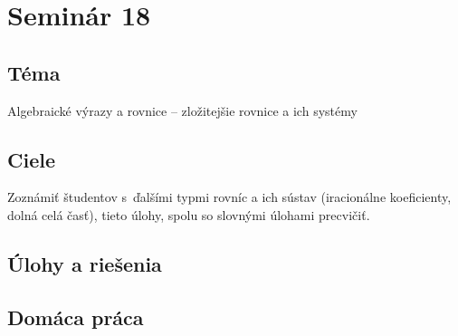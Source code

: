 \section*{Seminár 18}


\subsection*{Téma}
Algebraické výrazy a rovnice -- zložitejšie rovnice a ich systémy


\subsection*{Ciele}
Zoznámiť študentov s~ďalšími typmi rovníc a ich sústav (iracionálne koeficienty, dolná celá časť), tieto úlohy, spolu so slovnými úlohami precvičiť.


\subsection*{Úlohy a riešenia}



















\subsection*{Domáca práca}






